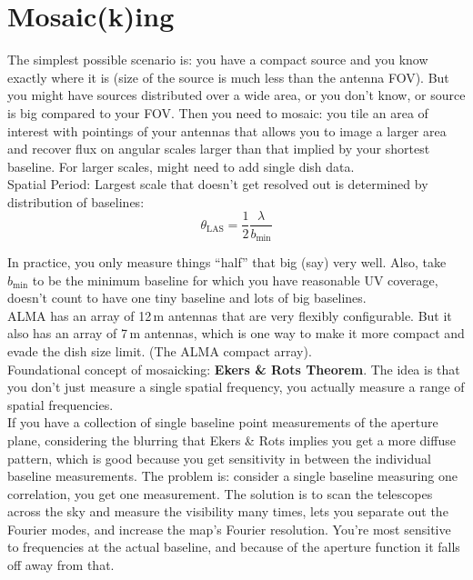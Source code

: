 \documentclass[a4paper]{article}
\begin{document}
\section{Mosaic(k)ing}

 The simplest possible scenario is: you have a compact source and you know exactly where it is (size of the source is much less than the antenna FOV). But you might have sources distributed over a wide area, or you don't know, or source is big compared to your FOV. Then you need to mosaic: you tile an area of interest with pointings of your antennas that allows you to image a larger area and recover flux on angular scales larger than that implied by your shortest baseline. For larger scales, might need to add single dish data.\\

Spatial Period: Largest scale that doesn't get resolved out is determined by distribution of baselines: $$ \theta_\mathrm{LAS} = \frac{1}{2} \frac{\lambda}{b_\mathrm{min}} $$

In practice, you only measure things ``half'' that big (say) very well. Also, take $b_\mathrm{min}$ to be the minimum baseline for which you have reasonable UV coverage, doesn't count to have one tiny baseline and lots of big baselines. \\

ALMA has an array of 12\,m antennas that are very flexibly configurable. But it also has an array of 7\,m antennas, which is one way to make it more compact and evade the dish size limit. (The ALMA compact array). \\

Foundational concept of mosaicking: \textbf{Ekers \& Rots Theorem}. The idea is that you don't just measure a single spatial frequency, you actually measure a range of spatial frequencies. \\

If you have a collection of single baseline point measurements of the aperture plane, considering the blurring that Ekers \& Rots implies you get a more diffuse pattern, which is good because you get sensitivity in between the individual baseline measurements. The problem is: consider a single baseline measuring one correlation, you get one measurement. The solution is to scan the telescopes across the sky and measure the visibility many times, lets you separate out the Fourier modes, and increase the map's Fourier resolution. You're most sensitive to frequencies at the actual baseline, and because of the aperture function it falls off away from that. 
\end{document}
